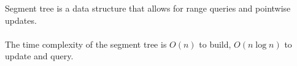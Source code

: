 Segment tree is a data structure that allows for range queries and pointwise updates.
\\ \\
The time complexity of the segment tree is $O(n)$ to build, $O(n \log n)$ to update and query.
\\ \\


